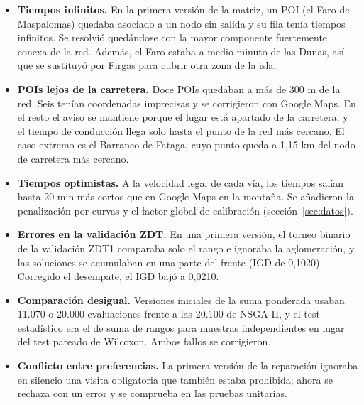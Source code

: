 \begin{itemize}
  \item \textbf{Tiempos infinitos.} En la primera versión de la matriz, un POI (el Faro de Maspalomas) quedaba asociado a un nodo sin salida y su fila tenía tiempos infinitos. Se resolvió quedándose con la mayor componente fuertemente conexa de la red. Además, el Faro estaba a medio minuto de las Dunas, así que se sustituyó por Firgas para cubrir otra zona de la isla.
  \item \textbf{POIs lejos de la carretera.} Doce POIs quedaban a más de 300 m de la red. Seis tenían coordenadas imprecisas y se corrigieron con Google Maps. En el resto el aviso se mantiene porque el lugar está apartado de la carretera, y el tiempo de conducción llega solo hasta el punto de la red más cercano. El caso extremo es el Barranco de Fataga, cuyo punto queda a 1,15 km del nodo de carretera más cercano.
  \item \textbf{Tiempos optimistas.} A la velocidad legal de cada vía, los tiempos salían hasta 20 min más cortos que en Google Maps en la montaña. Se añadieron la penalización por curvas y el factor global de calibración (sección~\ref{sec:datos}).
  \item \textbf{Errores en la validación ZDT.} En una primera versión, el torneo binario de la validación ZDT1 comparaba solo el rango e ignoraba la aglomeración, y las soluciones se acumulaban en una parte del frente (IGD de 0,1020). Corregido el desempate, el IGD bajó a 0,0210.
  \item \textbf{Comparación desigual.} Versiones iniciales de la suma ponderada usaban 11.070 o 20.000 evaluaciones frente a las 20.100 de NSGA-II, y el test estadístico era el de suma de rangos para muestras independientes en lugar del test pareado de Wilcoxon. Ambos fallos se corrigieron.
  \item \textbf{Conflicto entre preferencias.} La primera versión de la reparación ignoraba en silencio una visita obligatoria que también estaba prohibida; ahora se rechaza con un error y se comprueba en las pruebas unitarias.
\end{itemize}
